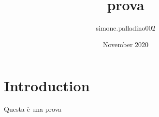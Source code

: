 \documentclass{article}
\title{prova}
\author{simone.palladino002 }
\date{November 2020}
\begin{document}
\maketitle

\section{Introduction}
Questa è una prova
\end{document}
